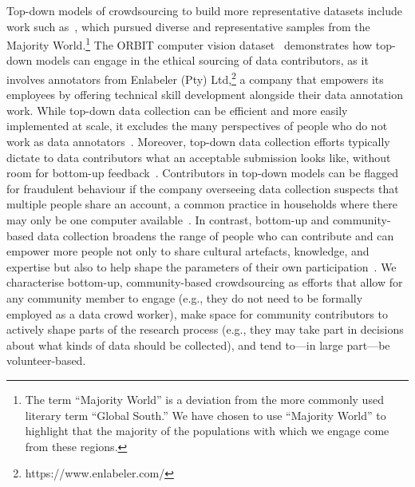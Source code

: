 Top-down models of crowdsourcing to build more representative datasets include work such as~\cite{bhutani2024seegull, jha2024visage,rojas2022the}, which pursued diverse and representative samples from the Majority World.\footnote{The term ``Majority World'' is a deviation from the more commonly used literary term ``Global South.'' We have chosen to use ``Majority World'' to highlight that the majority of the populations with which we engage come from these regions.} The ORBIT computer vision dataset~\cite{massiceti2021orbit} demonstrates how top-down models can engage in the ethical sourcing of data contributors, as it involves annotators from Enlabeler (Pty) Ltd,\footnote{https://www.enlabeler.com/} a company that empowers its employees by offering technical skill development alongside their data annotation work. While top-down data collection can be efficient and more easily implemented at scale, it excludes the many perspectives of people who do not work as data annotators~\cite{geiger2020garbage}. Moreover, top-down data collection efforts typically dictate to data contributors what an acceptable submission looks like, without room for bottom-up feedback~\cite{posada2022dispotif}. Contributors in top-down models can be flagged for fraudulent behaviour if the company overseeing data collection suspects that multiple people share an account, a common practice in households where there may only be one computer available~\cite{posada2022coloniality,jones2021refugees}. In contrast, bottom-up and community-based data collection broadens the range of people who can contribute and can empower more people not only to share cultural artefacts, knowledge, and expertise but also to help shape the parameters of their own participation~\cite{denton2021whose,delgado2023participatory,birhanePowerPeopleOpportunities2022}. We characterise bottom-up, community-based crowdsourcing as efforts that allow for any community member to engage (e.g., they do not need to be formally employed as a  data crowd worker), make space for community contributors to actively shape parts of the research process (e.g., they may take part in decisions about what kinds of data should be collected), and tend to---in large part---be volunteer-based.  

